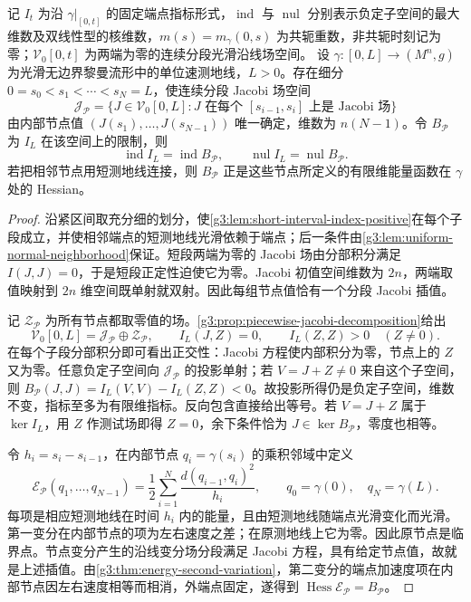 \begin{proposition}\label{g3:prop:morse-finite-reduction}
	记 \(I_t\) 为沿 \(\gamma|_{[0,t]}\) 的固定端点指标形式，\(\operatorname{ind}\) 与 \(\operatorname{nul}\) 分别表示负定子空间的最大维数及双线性型的核维数，\(m(s)=m_\gamma(0,s)\) 为共轭重数，非共轭时刻记为零；\(\mathcal V_0[0,t]\) 为两端为零的连续分段光滑沿线场空间。
	设 \(\gamma:[0,L]\to(M^n,g)\) 为光滑无边界黎曼流形中的单位速测地线，\(L>0\)。存在细分
	\(0=s_0<s_1<\cdots<s_N=L\)，使连续分段 Jacobi 场空间
	\[
		\mathcal J_{\mathcal P}=
		\{J\in\mathcal V_0[0,L]:J\text{ 在每个 }[s_{i-1},s_i]\text{ 上是 Jacobi 场}\}
	\]
	由内部节点值 \((J(s_1),\ldots,J(s_{N-1}))\) 唯一确定，维数为 \(n(N-1)\)。令 \(B_{\mathcal P}\) 为 \(I_L\) 在该空间上的限制，则
	\[
		\operatorname{ind}I_L=\operatorname{ind}B_{\mathcal P},\qquad
		\operatorname{nul}I_L=\operatorname{nul}B_{\mathcal P}.
	\]
	若把相邻节点用短测地线连接，则 \(B_{\mathcal P}\) 正是这些节点所定义的有限维能量函数在 \(\gamma\) 处的 Hessian。
\end{proposition}
\begin{proof}
	沿紧区间取充分细的划分，使\cref{g3:lem:short-interval-index-positive}在每个子段成立，并使相邻端点的短测地线光滑依赖于端点；后一条件由\cref{g3:lem:uniform-normal-neighborhood}保证。短段两端为零的 Jacobi 场由分部积分满足 \(I(J,J)=0\)，于是短段正定性迫使它为零。Jacobi 初值空间维数为 \(2n\)，两端取值映射到 \(2n\) 维空间既单射就双射。因此每组节点值恰有一个分段 Jacobi 插值。

	记 \(\mathcal Z_{\mathcal P}\) 为所有节点都取零值的场。\cref{g3:prop:piecewise-jacobi-decomposition}给出
	\[
		\mathcal V_0[0,L]=\mathcal J_{\mathcal P}\oplus\mathcal Z_{\mathcal P},\qquad
		I_L(J,Z)=0,\qquad I_L(Z,Z)>0\quad(Z\ne0).
	\]
	在每个子段分部积分即可看出正交性：Jacobi 方程使内部积分为零，节点上的 \(Z\) 又为零。任意负定子空间向 \(\mathcal J_{\mathcal P}\) 的投影单射；若 \(V=J+Z\ne0\) 来自这个子空间，则
	\(B_{\mathcal P}(J,J)=I_L(V,V)-I_L(Z,Z)<0\)。故投影所得仍是负定子空间，维数不变，指标至多为有限维指标。反向包含直接给出等号。若 \(V=J+Z\) 属于 \(\ker I_L\)，用 \(Z\) 作测试场即得 \(Z=0\)，余下条件恰为 \(J\in\ker B_{\mathcal P}\)，零度也相等。

	令 \(h_i=s_i-s_{i-1}\)，在内部节点 \(q_i=\gamma(s_i)\) 的乘积邻域中定义
	\[
		\mathcal E_{\mathcal P}(q_1,\ldots,q_{N-1})
		=\frac12\sum_{i=1}^N\frac{d(q_{i-1},q_i)^2}{h_i},
		\qquad q_0=\gamma(0),\quad q_N=\gamma(L).
	\]
	每项是相应短测地线在时间 \(h_i\) 内的能量，且由短测地线随端点光滑变化而光滑。第一变分在内部节点的项为左右速度之差；在原测地线上它为零。因此原节点是临界点。节点变分产生的沿线变分场分段满足 Jacobi 方程，具有给定节点值，故就是上述插值。由\cref{g3:thm:energy-second-variation}，第二变分的端点加速度项在内部节点因左右速度相等而相消，外端点固定，遂得到 \(\operatorname{Hess}\mathcal E_{\mathcal P}=B_{\mathcal P}\)。
\end{proof}

